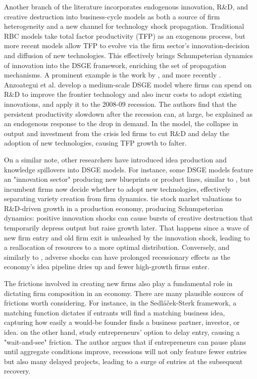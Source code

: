 \documentclass[a4paper,12pt]{article} %
\numberwithin{equation}{section} %
\numberwithin{figure}{section}
\numberwithin{table}{section}
\begin{document}
Another branch of the literature incorporates endogenous innovation, R\&D, and creative destruction into business-cycle models as both a source of firm heterogeneity and a 
new channel for technology shock propagation. Traditional RBC models take total factor productivity (TFP) as an exogenous process, but more recent models allow TFP to evolve via 
the firm sector's innovation-decision and diffusion of new technologies. This effectively brings Schumpeterian dynamics of innovation into the DSGE framework, enriching the 
set of propagation mechanisms.  A prominent example is the work by \textcite{comin2006medium}, and more recently \textcite{anzoategui2019endogenous}. Anzoategui et al. 
develop a medium-scale DSGE model where firms can spend on R\&D to improve the frontier technology and also incur costs to adopt existing innovations, and apply it to the 2008-09 recession. 
The authors find that the persistent productivity slowdown after the recession can, at large, be explained as an endogenous response to the drop in demand. In the model, the collapse in output 
and investment from the crisis led firms to cut R\&D and delay the adoption of new technologies, causing TFP growth to falter.

On a similar note, other researchers have introduced idea production and knowledge spillovers into DSGE models. For instance,
some DSGE models feature an "innovation sector" producing new blueprints or product lines, similar to \textcite{bilbiie2012endogenous},
but incumbent firms now decide whether to adopt new technologies, effectively separating variety creation from firm dynamics.
\textcite{kung2015innovation} tie stock market valuations to R\&D-driven growth in a production economy, producing Schumpeterian dynamics: 
positive innovation shocks can cause bursts of creative destruction that temporarily depress output but raise growth later. That happens 
since a wave of new firm entry and old firm exit is unleashed by the innovation shock, leading to a reallocation of resources to a more 
optimal distribution. Conversely, and similarly to \textcite{sedlavcek2017growth}, adverse shocks can have prolonged recessionary effects
as the economy's idea pipeline dries up and fewer high-growth firms enter.


The frictions involved in creating new firms also play a fundamental role in dictating firm composition in an economy. There are many plausible 
sources of frictions worth considering. For instance, in the Sedláček-Sterk framework, a matching function dictates if entrants will find a matching
business idea, capturing how easily a would-be founder finds a business partner, investor, or idea. \textcite{vardishvili2023entry} on the other hand,
study entrepreneurs' option to delay entry, causing a "wait-and-see" friction. The author argues that if entrepreneurs can pause plans until aggregate
conditions improve, recessions will not only feature fewer entries but also many delayed projects, leading to a surge of entries at the subsequent recovery.
\end{document}
